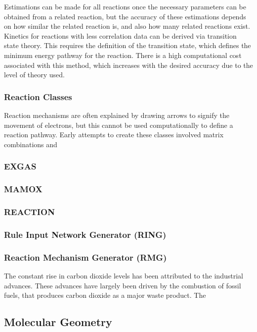 \documentclass[12pt]{article}
\begin{document}
Estimations can be made for all reactions once the necessary parameters can be obtained from a related reaction, but the accuracy of these estimations depends on how similar the related reaction is, and also how many related reactions exist. Kinetics for reactions with less correlation data can be derived via transition state theory. This requires the definition of the transition state, which defines the minimum energy pathway for the reaction. There is a high computational cost associated with this method, which increases with the desired accuracy due to the level of theory used.

\subsubsection{Reaction Classes}
Reaction mechanisms are often explained by drawing arrows to signify the movement of electrons, but this cannot be used computationally to define a reaction pathway. Early attempts to create these classes involved matrix combinations and 

\subsubsection{EXGAS}
\subsubsection{MAMOX}
\subsubsection{REACTION}
\subsubsection{Rule Input Network Generator (RING)}
\subsubsection{Reaction Mechanism Generator (RMG)}

The constant rise in carbon dioxide levels has been attributed to the industrial advances. These advances have largely been driven by the combustion of fossil fuels, that produces carbon dioxide as a major waste product. The 

\subsection{Molecular Geometry}
\end{document}
